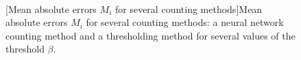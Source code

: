 \begin{figure}[t]
    \centering
    \\
    [Mean absolute errors $M_i$ for several counting methods]{Mean absolute errors $M_i$ for several counting methods: a neural network counting method and a thresholding method for several values of the threshold $\beta$.}
    \label{fig:hybrid_nosPrediction_mae}
\end{figure}

